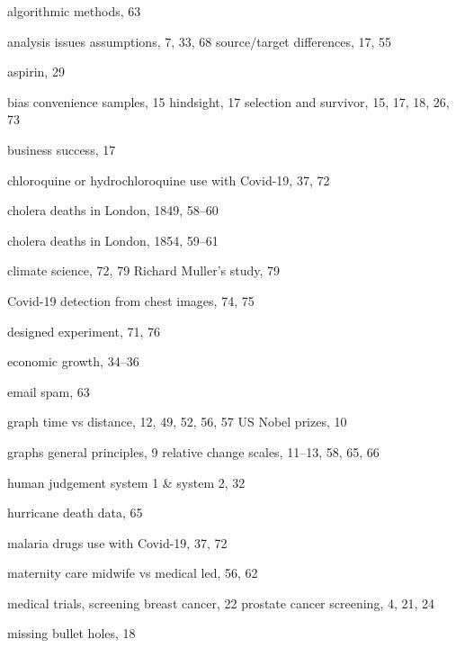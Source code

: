 \documentclass[
  10pt,
  b5paper]{book}
\begin{document}
\begin{theindex}

  \item algorithmic methods, 63
  \item analysis issues
    \subitem assumptions, 7, 33, 68
    \subitem source/target differences, 17, 55
  \item aspirin, 29

  \indexspace

  \item bias
    \subitem convenience samples, 15
    \subitem hindsight, 17
    \subitem selection and survivor, 15, 17, 18, 26, 73
  \item business success, 17

  \indexspace

  \item chloroquine or hydrochloroquine
    \subitem use with Covid-19, 37, 72
  \item cholera deaths in London, 1849, 58--60
  \item cholera deaths in London, 1854, 59--61
  \item climate science, 72, 79
    \subitem Richard Muller's study, 79
  \item Covid-19
    \subitem detection from chest images, 74, 75

  \indexspace

  \item designed experiment, 71, 76

  \indexspace

  \item economic growth, 34--36
  \item email spam, 63

  \indexspace

  \item graph
    \subitem time vs distance, 12, 49, 52, 56, 57
    \subitem US Nobel prizes, 10
  \item graphs
    \subitem general principles, 9
    \subitem relative change scales, 11--13, 58, 65, 66

  \indexspace

  \item human judgement
    \subitem system 1 \& system 2, 32
  \item hurricane death data, 65

  \indexspace

  \item malaria drugs
    \subitem use with Covid-19, 37, 72
  \item maternity care
    \subitem midwife vs medical led, 56, 62
  \item medical trials, screening
    \subitem breast cancer, 22
    \subitem prostate cancer screening, 4, 21, 24
  \item missing bullet holes, 18


\end{theindex}
\end{document}
